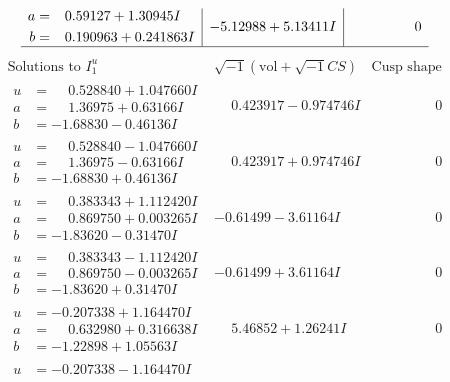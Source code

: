 \documentclass[1p]{elsarticle_modified}
\theoremstyle{definition}
\newcommand{\I}{\sqrt{-1}}
\begin{document}
$$\begin{array}{c|c|c}
\begin{aligned}
a &= \phantom{-}0.59127 + 1.30945 I \\
b &= \phantom{-}0.190963 + 0.241863 I\end{aligned}
 & -5.12988 + 5.13411 I & \phantom{-0.000000 } 0\\
 \hline 
 \end{array}$$\newpage$$\begin{array}{c|c|c}  
\text{Solutions to }I^u_{1}& \I (\text{vol} + \sqrt{-1}CS) & \text{Cusp shape}\\
 \hline 
\begin{aligned}
u &= \phantom{-}0.528840 + 1.047660 I \\
a &= \phantom{-}1.36975 + 0.63166 I \\
b &= -1.68830 - 0.46136 I\end{aligned}
 & \phantom{-}0.423917 - 0.974746 I & \phantom{-0.000000 } 0 \\ \hline\begin{aligned}
u &= \phantom{-}0.528840 - 1.047660 I \\
a &= \phantom{-}1.36975 - 0.63166 I \\
b &= -1.68830 + 0.46136 I\end{aligned}
 & \phantom{-}0.423917 + 0.974746 I & \phantom{-0.000000 } 0 \\ \hline\begin{aligned}
u &= \phantom{-}0.383343 + 1.112420 I \\
a &= \phantom{-}0.869750 + 0.003265 I \\
b &= -1.83620 - 0.31470 I\end{aligned}
 & -0.61499 - 3.61164 I & \phantom{-0.000000 } 0 \\ \hline\begin{aligned}
u &= \phantom{-}0.383343 - 1.112420 I \\
a &= \phantom{-}0.869750 - 0.003265 I \\
b &= -1.83620 + 0.31470 I\end{aligned}
 & -0.61499 + 3.61164 I & \phantom{-0.000000 } 0 \\ \hline\begin{aligned}
u &= -0.207338 + 1.164470 I \\
a &= \phantom{-}0.632980 + 0.316638 I \\
b &= -1.22898 + 1.05563 I\end{aligned}
 & \phantom{-}5.46852 + 1.26241 I & \phantom{-0.000000 } 0 \\ \hline\begin{aligned}
u &= -0.207338 - 1.164470 I \\

\end{aligned}
\end{array}$$
\end{document}
